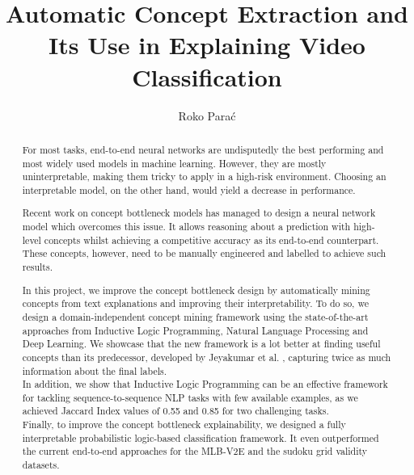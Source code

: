 \documentclass[a4paper, twoside, 12pt]{report}
\title{Automatic Concept Extraction and Its Use in Explaining Video Classification}
\author{Roko Parać}
\theoremstyle{definition} %
\begin{document}
\renewcommand{\vec}[1]{\textbf{#1}}
\newcommand{\curly}[1]{\mathcal{#1}}
\newcommand{\expct}{\mathbb{E}}
\newcommand{\reals}{\mathbb{R}}





\begin{abstract}
For most tasks, end-to-end neural networks are undisputedly the best performing and most widely used models in machine learning.
However, they are mostly uninterpretable, making them tricky to apply in a high-risk environment.
Choosing an interpretable model, on the other hand, would yield a decrease in performance.

Recent work on concept bottleneck models \cite{RefWorks:RefID:35-koh2020concept} has managed to design a neural network model which overcomes this issue.
It allows reasoning about a prediction with high-level concepts whilst achieving a competitive accuracy as its end-to-end counterpart.
These concepts, however, need to be manually engineered and labelled to achieve such results.

In this project, we improve the concept bottleneck design by automatically mining concepts from text explanations and improving their interpretability.
To do so, we design a domain-independent concept mining framework using the state-of-the-art approaches from Inductive Logic Programming, Natural Language Processing and Deep Learning.
We showcase that the new framework is a lot better at finding useful concepts than its predecessor, developed by Jeyakumar et al. \cite{RefWorks:RefID:16-2021automatic}, capturing twice as much information about the final labels.\\
In addition, we show that Inductive Logic Programming can be an effective framework for tackling sequence-to-sequence NLP tasks with few available examples, as we achieved Jaccard Index values of 0.55 and 0.85 for two challenging tasks. \\
Finally, to improve the concept bottleneck explainability, we designed a fully interpretable probabilistic logic-based classification framework. It even outperformed the current end-to-end approaches for the MLB-V2E and the sudoku grid validity datasets.

\end{abstract}
\end{document}
